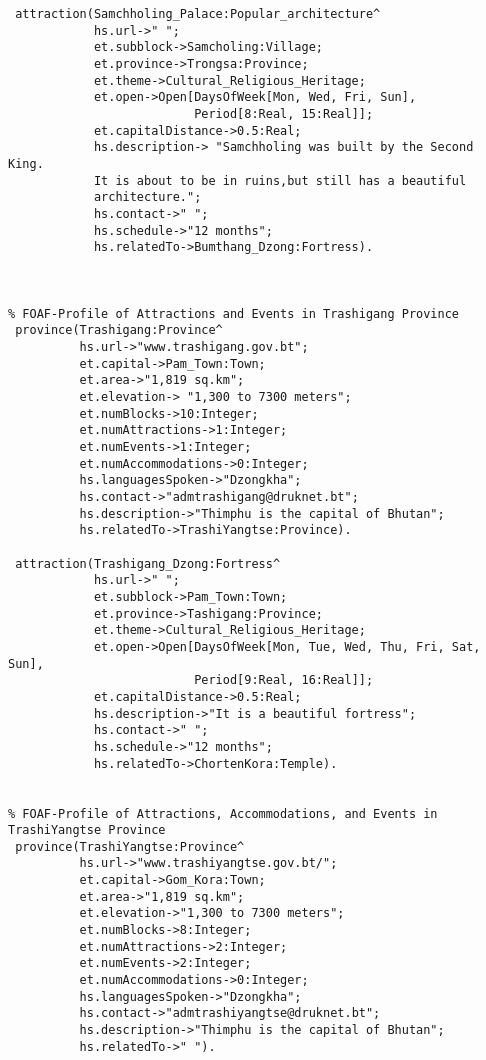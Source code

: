 \begin{verbatim}
 attraction(Samchholing_Palace:Popular_architecture^
            hs.url->" ";
            et.subblock->Samcholing:Village;
            et.province->Trongsa:Province;
            et.theme->Cultural_Religious_Heritage;
            et.open->Open[DaysOfWeek[Mon, Wed, Fri, Sun],
                          Period[8:Real, 15:Real]];
            et.capitalDistance->0.5:Real;
            hs.description-> "Samchholing was built by the Second King.
            It is about to be in ruins,but still has a beautiful 
            architecture.";
            hs.contact->" ";
            hs.schedule->"12 months";
            hs.relatedTo->Bumthang_Dzong:Fortress).
          
         
                         
% FOAF-Profile of Attractions and Events in Trashigang Province
 province(Trashigang:Province^
          hs.url->"www.trashigang.gov.bt";
          et.capital->Pam_Town:Town;
          et.area->"1,819 sq.km";
          et.elevation-> "1,300 to 7300 meters";
          et.numBlocks->10:Integer;
          et.numAttractions->1:Integer;
          et.numEvents->1:Integer;
          et.numAccommodations->0:Integer;
          hs.languagesSpoken->"Dzongkha";
          hs.contact->"admtrashigang@druknet.bt";
          hs.description->"Thimphu is the capital of Bhutan";
          hs.relatedTo->TrashiYangtse:Province).
 
 attraction(Trashigang_Dzong:Fortress^
            hs.url->" ";
            et.subblock->Pam_Town:Town;
            et.province->Tashigang:Province;
            et.theme->Cultural_Religious_Heritage;
            et.open->Open[DaysOfWeek[Mon, Tue, Wed, Thu, Fri, Sat, Sun],
                          Period[9:Real, 16:Real]];
            et.capitalDistance->0.5:Real;
            hs.description->"It is a beautiful fortress";
            hs.contact->" ";
            hs.schedule->"12 months";
            hs.relatedTo->ChortenKora:Temple).


% FOAF-Profile of Attractions, Accommodations, and Events in TrashiYangtse Province
 province(TrashiYangtse:Province^
          hs.url->"www.trashiyangtse.gov.bt/";
          et.capital->Gom_Kora:Town;
          et.area->"1,819 sq.km";
          et.elevation->"1,300 to 7300 meters";
          et.numBlocks->8:Integer;
          et.numAttractions->2:Integer;
          et.numEvents->2:Integer;
          et.numAccommodations->0:Integer;
          hs.languagesSpoken->"Dzongkha";
          hs.contact->"admtrashiyangtse@druknet.bt";
          hs.description->"Thimphu is the capital of Bhutan";
          hs.relatedTo->" ").
   

\end{verbatim}
